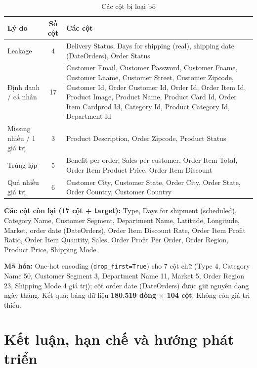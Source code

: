 \documentclass[11pt,a4paper]{article}
\newcommand{\col}[1]{\textsf{#1}}
\begin{document}
\begin{table}[H]\centering
\caption{Các cột bị loại bỏ}
\small
\begin{tabularx}{\linewidth}{@{}p{3.6cm}cX@{}}
\toprule
\textbf{Lý do} & \textbf{Số cột} & \textbf{Các cột} \\ \midrule
Leakage & 4 & Delivery Status, Days for shipping (real), shipping date (DateOrders), Order Status \\
Định danh / cá nhân & 17 & Customer Email, Customer Password, Customer Fname, Customer Lname, Customer Street, Customer Zipcode, Customer Id, Order Customer Id, Order Id, Order Item Id, Product Image, Product Name, Product Card Id, Order Item Cardprod Id, Category Id, Product Category Id, Department Id \\
Missing nhiều / 1 giá trị & 3 & Product Description, Order Zipcode, Product Status \\
Trùng lặp & 5 & Benefit per order, Sales per customer, Order Item Total, Order Item Product Price, Order Item Discount \\
Quá nhiều giá trị & 6 & Customer City, Customer State, Order City, Order State, Order Country, Customer Country \\
\bottomrule
\end{tabularx}
\end{table}

\textbf{Các cột còn lại (17 cột + target):} Type, Days for shipment (scheduled), Category Name, Customer Segment,
Department Name, Latitude, Longitude, Market, order date (DateOrders), Order Item Discount Rate, Order Item Profit Ratio, Order Item Quantity,
Sales, Order Profit Per Order, Order Region, Product Price, Shipping Mode.

\textbf{Mã hóa:} One-hot encoding (\texttt{drop\_first=True}) cho 7 cột chữ (Type 4, Category Name 50, Customer Segment 3,
Department Name 11, Market 5, Order Region 23, Shipping Mode 4 giá trị); cột \col{order date (DateOrders)} được giữ nguyên dạng ngày tháng. Kết quả: bảng dữ liệu \textbf{180.519 dòng $\times$ 104 cột}. Không còn giá trị thiếu.

\section{Kết luận, hạn chế và hướng phát triển}
\end{document}
